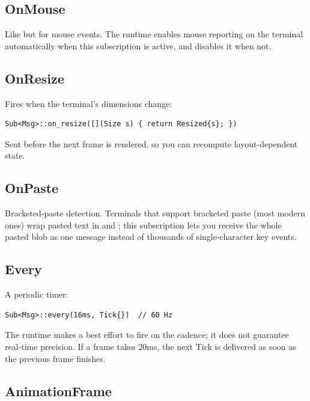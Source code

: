 \subsection*{OnMouse}

Like  but for mouse events. The runtime enables mouse
reporting on the terminal automatically when this subscription is
active, and disables it when not.

\subsection*{OnResize}

Fires when the terminal's dimensions change:

\begin{lstlisting}
Sub<Msg>::on_resize([](Size s) { return Resized{s}; })
\end{lstlisting}

Sent before the next frame is rendered, so you can recompute
layout-dependent state.

\subsection*{OnPaste}

Bracketed-paste detection. Terminals that support bracketed paste
(most modern ones) wrap pasted text in \code{\textbackslash e[200\textasciitilde}
and \code{\textbackslash e[201\textasciitilde}; this subscription
lets you receive the whole pasted blob as one message instead of
thousands of single-character key events.

\subsection*{Every}

A periodic timer:

\begin{lstlisting}
Sub<Msg>::every(16ms, Tick{})  // 60 Hz
\end{lstlisting}

The runtime makes a best effort to fire on the cadence; it does
not guarantee real-time precision. If a frame takes 20ms, the next
Tick is delivered as soon as the previous frame finishes.

\subsection*{AnimationFrame}

